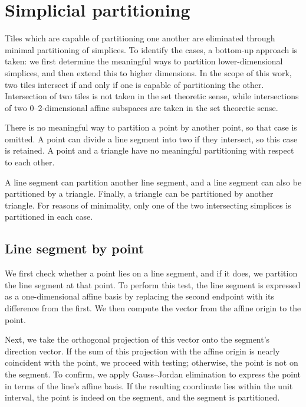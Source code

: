 \chapter{Simplicial partitioning}

Tiles which are capable of partitioning one another are 
eliminated through minimal partitioning of simplices.  
To identify the cases, a bottom-up approach is taken: we first determine 
the meaningful ways to partition lower-dimensional simplices, and then 
extend this to higher dimensions. In the scope of this work, two 
tiles intersect if and only if one is capable of partitioning the 
other. Intersection of two tiles is not taken in the set theoretic
sense, while intersections of two 0--2-dimensional affine subspaces
are taken in the set theoretic sense.

There is no meaningful way to partition a point by another point, so 
that case is omitted. A point can divide a line segment into two if they 
intersect, so this case is retained. A point and a triangle have no 
meaningful partitioning with respect to each other.  

A line segment can partition another line segment, and a line segment 
can also be partitioned by a triangle. Finally, a triangle can be 
partitioned by another triangle. For reasons of minimality, only one 
of the two intersecting simplices is partitioned in each case.

\section{Line segment by point}

We first check whether a point lies on a line segment, and if it does, 
we partition the line segment at that point. To perform this test, the 
line segment is expressed as a one-dimensional affine basis by replacing 
the second endpoint with its difference from the first. We then compute 
the vector from the affine origin to the point.

Next, we take the orthogonal projection of this vector onto the segment's 
direction vector. If the sum of this projection with the affine origin is 
nearly coincident with the point, we proceed with testing; otherwise, the 
point is not on the segment. To confirm, we apply Gauss--Jordan elimination 
to express the point in terms of the line's affine basis. If the resulting 
coordinate lies within the unit interval, the point is indeed on the 
segment, and the segment is partitioned.

